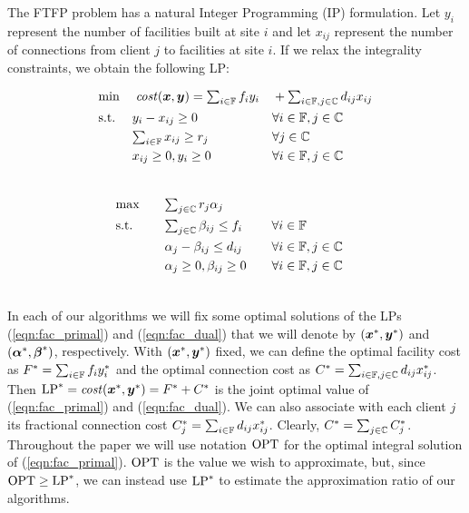 \documentclass{llncs}
\begin{document}
The FTFP problem has a natural Integer Programming (IP)
formulation. Let $y_i$ represent the number of facilities
built at site $i$ and let $x_{ij}$ represent the number of
connections from client $j$ to facilities at site $i$. If we
relax the integrality constraints, we obtain the following LP:

\noindent
\hspace{-0.1in}
\begin{minipage}{3.5in}
\begin{alignat}{3}
  &\textrm{min} &&\;\textstyle{{\it cost}(\boldsymbol{x},\boldsymbol{y})} = \textstyle{ \sum_{i\in \mathbb{F}}f_iy_i }
 		&&	+ \textstyle{ \sum_{i\in \mathbb{F}, j\in \mathbb{C}}d_{ij}x_{ij} }  \label{eqn:fac_primal} 	
								\\ \notag
  &\textrm{s.t.} && y_i - x_{ij} \geq 0 &&  \forall i\in \mathbb{F}, j\in \mathbb{C} 
									\\ \notag
  & &&\textstyle{\sum_{i\in \mathbb{F}} x_{ij} \geq r_j} && \forall j\in \mathbb{C}
 									\\ \notag
  & &&\textstyle{ x_{ij} \geq 0, y_i \geq 0} && \forall i\in \mathbb{F}, j\in \mathbb{C} 
  									\\ \notag
\end{alignat}
\end{minipage}
\hspace{0.01in}
\begin{minipage}{3in}
\begin{alignat}{3}
  &\textrm{max}&\quad& \textstyle{\sum_{j\in \mathbb{C}} r_j\alpha_j}\label{eqn:fac_dual}  
     						\\ \notag
  &\textrm{s.t.} && \textstyle{
    \sum_{j\in \mathbb{C}}\beta_{ij} \leq f_i}  &\quad& \forall i \in \mathbb{F}  
							\\ \notag
  & &&\textstyle{\alpha_{j} - \beta_{ij} \leq
    d_{ij}}  && \forall i\in \mathbb{F}, j\in \mathbb{C} 
							\\ \notag
  & &&\textstyle{\alpha_j \geq 0,
    \beta_{ij} \geq 0} && \forall i\in \mathbb{F}, j\in \mathbb{C}
  							\\ \notag
\end{alignat}
\end{minipage}

In each of our algorithms we will fix some optimal solutions of the
LPs (\ref{eqn:fac_primal}) and (\ref{eqn:fac_dual}) that we will
denote by $(\boldsymbol{x}^\ast, \boldsymbol{y}^\ast)$ and $(\boldsymbol{\alpha}^\ast,\boldsymbol{\beta}^\ast)$,
respectively. With $(\boldsymbol{x}^\ast, \boldsymbol{y}^\ast)$ fixed, we can define the
optimal facility cost as $F^\ast=\sum_{i\in\mathbb{F}} f_i y_i^\ast$
and the optimal connection cost as $C^\ast =
\sum_{i\in\mathbb{F},j\in\mathbb{C}} d_{ij}x_{ij}^\ast$.  Then
$\mbox{\rm LP}^\ast = {\it cost}(\boldsymbol{x}^\ast,\boldsymbol{y}^\ast) = F^\ast+C^\ast$ is the joint
optimal value of (\ref{eqn:fac_primal}) and (\ref{eqn:fac_dual}).  We
can also associate with each client $j$ its fractional connection cost
$C^\ast_j = \sum_{i\in\mathbb{F}} d_{ij}x_{ij}^\ast$.  Clearly, $C^\ast
= \sum_{j\in\mathbb{C}} C^\ast_j$.  Throughout the paper we will use
notation $\mbox{\rm OPT}$ for the optimal integral solution of
(\ref{eqn:fac_primal}).  $\mbox{\rm OPT}$ is the value we wish to approximate,
but, since $\mbox{\rm OPT}\ge\mbox{\rm LP}^\ast$, we can instead use $\mbox{\rm LP}^\ast$ to
estimate the approximation ratio of our algorithms.
\end{document}
